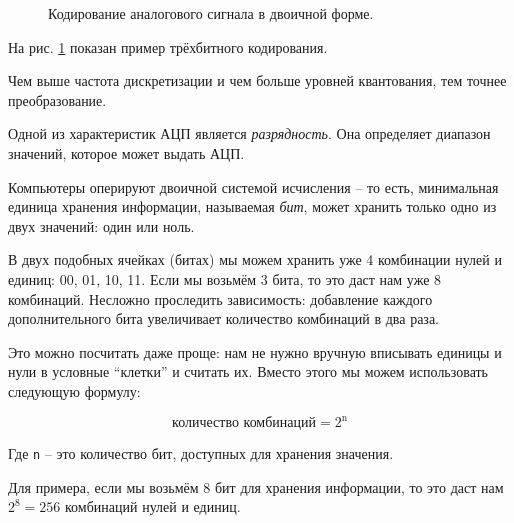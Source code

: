 \documentclass[../sparc.tex]{subfiles}
\begin{document}
\begin{enumerate}
\begin{figure}[H]
    \caption{Кодирование аналогового сигнала в двоичной форме.}
    \label{fig:encoding}
  \end{figure}

  На рис. \ref{fig:encoding} показан пример трёхбитного кодирования.

  Чем выше частота дискретизации и чем больше уровней квантования, тем точнее
  преобразование.

\end{enumerate}

Одной из характеристик АЦП является \emph{разрядность}.  Она определяет диапазон
значений, которое может выдать АЦП.

Компьютеры оперируют двоичной системой исчисления -- то есть, минимальная единица
хранения информации, называемая \emph{бит}, может хранить только одно из двух
значений: один или ноль.

В двух подобных ячейках (битах) мы можем хранить уже 4 комбинации нулей и
единиц: 00, 01, 10, 11.  Если мы возьмём 3 бита, то это даст нам уже 8
комбинаций.  Несложно проследить зависимость: добавление каждого дополнительного
бита увеличивает количество комбинаций в два раза.

Это можно посчитать даже проще: нам не нужно вручную вписывать единицы и нули в
условные ``клетки'' и считать их.  Вместо этого мы можем использовать следующую
формулу:

\begin{equation}
  \mbox{количество комбинаций} = 2^{\mbox{n}}
\end{equation}

Где \texttt{n} -- это количество бит, доступных для хранения значения.

Для примера, если мы возьмём 8 бит для хранения информации, то это даст нам $2^8
= 256$ комбинаций нулей и единиц.
\end{document}
